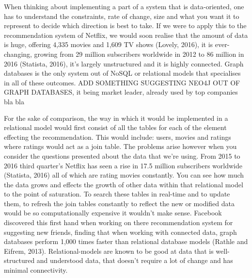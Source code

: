\documentclass[a4paper]{article}
\begin{document}
When thinking about implementing a part of a system that is data-oriented, one has to understand the constraints, rate of change, size and what you want it to represent to decide which direction is best to take. If we were to apply this to the recommendation system of Netflix, we would soon realise that the amount of data is huge, offering 4,335 movies and 1,609 TV shows (Lovely, 2016), it is ever-changing, growing from 29 million subscribers worldwide in 2012 to 86 million in 2016 (Statista, 2016), it's largely unstructured and it is highly connected. Graph databases is the only system out of NoSQL or relational models that specialises in all of these outcomes. ADD SOMETHING SUGGESTING NEO4J OUT OF GRAPH DATABASES, it being market leader, already used by top companies bla bla\par

For the sake of comparison, the way in which it would be implemented in a relational model would first consist of all the tables for each of the element effecting the recommendation. This would include: users, movies and ratings where ratings would act as a join table. The problems arise however when you consider the questions presented about the data that we're using. From 2015 to 2016 third quarter's Netflix has seen a rise in 17.5 million subscribers worldwide (Statista, 2016) all of which are rating movies constantly. You can see how much the data grows and effects the growth of other data within that relational model to the point of saturation. To search these tables in real-time and to update them, to refresh the join tables constantly to reflect the new or modified data would be so computationally expensive it wouldn't make sense. Facebook discovered this first hand when working on there recommendation system for suggesting new friends, finding that when working with connected data, graph databases perform 1,000 times faster than relational database models (Rathle and Eifrem, 2013). Relational-models are known to be good at data that is well-structured and understood data, that doesn't require a lot of change and has minimal connectivity.
\end{document}
